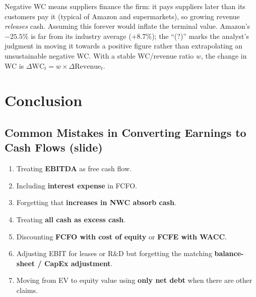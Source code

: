 \begin{addbox}
Negative WC means suppliers finance the firm: it pays suppliers later than its customers pay it (typical of Amazon and supermarkets), so growing revenue \emph{releases} cash. Assuming this forever would inflate the terminal value. Amazon's $-25.5\%$ is far from its industry average ($+8.7\%$); the ``(?)'' marks the analyst's judgment in moving it towards a positive figure rather than extrapolating an unsustainable negative WC. With a stable WC/revenue ratio $w$, the change in WC is $\Delta\text{WC}_t=w\times\Delta\text{Revenue}_t$.
\end{addbox}

\section{Conclusion}

\subsection{Common Mistakes in Converting Earnings to Cash Flows (slide)}
\begin{enumerate}
  \item Treating \textbf{EBITDA} as free cash flow.
  \item Including \textbf{interest expense} in FCFO.
  \item Forgetting that \textbf{increases in NWC absorb cash}.
  \item Treating \textbf{all cash as excess cash}.
  \item Discounting \textbf{FCFO with cost of equity} or \textbf{FCFE with WACC}.
  \item Adjusting EBIT for leases or R\&D but forgetting the matching \textbf{balance-sheet / CapEx adjustment}.
  \item Moving from EV to equity value using \textbf{only net debt} when there are other claims.
\end{enumerate}

